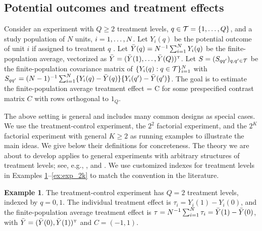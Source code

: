 \documentclass[11pt]{article}
\theoremstyle{definition}
\newtheorem{example}{Example}
\begin{document}
\subsection{Potential outcomes and treatment effects}
Consider an experiment with $Q \geq 2$ treatment levels, $q \in \mathcal{T} = \{1, \ldots,Q\}$, and a study population of $N$ units,  $i = 1, \ldots,N$.
Let $Y_i(q)$ be the potential outcome of unit $i$ if assigned to treatment $q$ \citep{Neyman23}. 
Let $\bar Y(q) = N^{-1} \sum_{i=1}^N Y_i(q)$ be the finite-population average, vectorized as 
$\bar{ Y} = (\bar Y(1),   \dots, \bar Y(Q))^{ \mathrm{\scriptscriptstyle T} }$. 
Let $ S = (S_{qq'})_{q, q'\in\mathcal{T}}$ be the finite-population covariance matrix of $\{Y_i(q): q \in \mathcal{T} \}_{i=1}^N$ with $S_{qq'} = (N-1)^{-1}\sum_{i=1}^N\{Y_i(q) - \bar Y(q)\}\{Y_i(q') - \bar Y(q')\}$. 
The goal is to estimate the finite-population average treatment effect 
\beginy\label{eq:tau}
\tau = C \bY
\endy 
for some prespecified contrast matrix $C$ with rows orthogonal to $1_Q$. 

The above setting is general and includes many common designs as special cases. 
We use the treatment-control experiment, the $2^2$ factorial experiment, and the $2^K$  factorial experiment with general $K \geq 2$ as running examples to illustrate the main ideas. 
We give below their definitions for concreteness. 
The theory we are about to develop applies to general experiments with arbitrary structures of treatment levels; see, e.g., \cite{Karlan2007, Sinclair2012, alsan}, and \citet[][Section A]{ZDa}.
We use customized indexes for treatment levels in Examples \ref{ex:exp_trt}--\ref{ex:exp_2k} to match the convention in the literature. 

\begin{example}\label{ex:exp_trt} The treatment-control experiment has $Q=2$ treatment levels, indexed by $q = 0, 1$. 
The individual treatment effect is $\tau_i  = Y_i(1) - Y_i(0)$, and the finite-population average treatment effect is $\tau = N^{-1} \sum_{i=1}^N  \tau_i = \bar Y(1) - \bar Y(0)$, with $\bar Y = (\bar Y(0), \bar Y(1))^{ \mathrm{\scriptscriptstyle T} }$ and $C = (-1, 1)$. 
\end{example}
\end{document}
